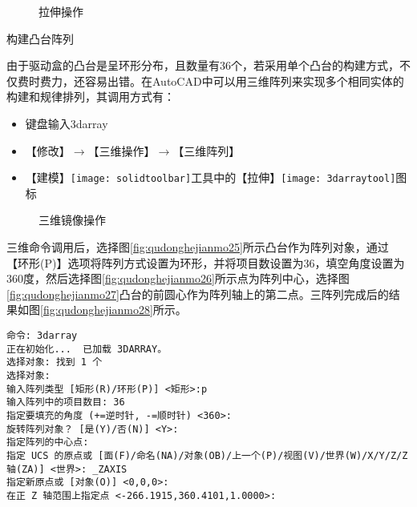 \begin{procedure}
\begin{figure}[htbp]
\centering
{}\hspace{60pt}
\caption{拉伸操作}
\end{figure}

\item 构建凸台阵列

由于驱动盒的凸台是呈环形分布，且数量有36个，若采用单个凸台的构建方式，不仅费时费力，还容易出错。在AutoCAD中可以用三维阵列来实现多个相同实体的构建和规律排列，其调用方式有：
\begin{itemize}
	\item 键盘输入3darray
	\item 【修改】$\rightarrow$【三维操作】$\rightarrow$【三维阵列】
	\item 【建模】\texttt{[image: solidtoolbar]}工具中的【拉伸】\texttt{[image: 3darraytool]}图标	
\end{itemize}

\begin{figure}[htbp]
\centering
{}\hspace{20pt}
\hspace{20pt}
\hspace{20pt}
\caption{三维镜像操作}
\end{figure}

三维命令调用后，选择图\ref{fig:qudonghejianmo25}所示凸台作为阵列对象，通过【环形(P)】选项将阵列方式设置为环形，并将项目数设置为36，填空角度设置为360度，然后选择图\ref{fig:qudonghejianmo26}所示点为阵列中心，选择图\ref{fig:qudonghejianmo27}凸台的前圆心作为阵列轴上的第二点。三阵列完成后的结果如图\ref{fig:qudonghejianmo28}所示。
\begin{lstlisting}
命令: 3darray
正在初始化...  已加载 3DARRAY。
选择对象: 找到 1 个
选择对象:
输入阵列类型 [矩形(R)/环形(P)] <矩形>:p
输入阵列中的项目数目: 36
指定要填充的角度 (+=逆时针, -=顺时针) <360>:
旋转阵列对象？ [是(Y)/否(N)] <Y>:
指定阵列的中心点:
指定 UCS 的原点或 [面(F)/命名(NA)/对象(OB)/上一个(P)/视图(V)/世界(W)/X/Y/Z/Z 轴(ZA)] <世界>: _ZAXIS
指定新原点或 [对象(O)] <0,0,0>:
在正 Z 轴范围上指定点 <-266.1915,360.4101,1.0000>:
\end{lstlisting}


\end{procedure}
